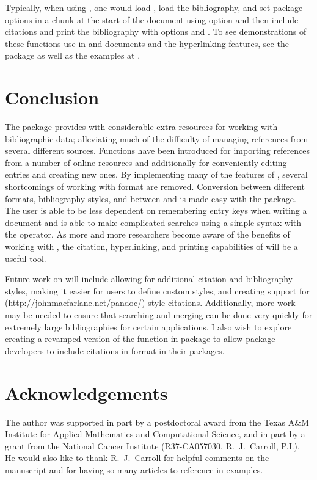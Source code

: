 \documentclass[article]{jss}\usepackage[]{graphicx}\usepackage[]{color}
\newcommand{\ourpkg}{\pkg{RefManageR}}
\newcommand{\bt}{\`{}}
\begin{document}
Typically, when using , one would load \ourpkg{}, load the bibliography, and set package options in a chunk at the start of the document using option  and then include citations and print the bibliography with options  and .  To see demonstrations of these functions use in  and  documents and the hyperlinking features, see the package  as well as the examples at .

\section{Conclusion}\label{sec_conc}
The \ourpkg{} package provides \R{} with considerable extra resources for working with bibliographic data; alleviating much of the difficulty of managing references from several different sources.  Functions have been introduced for importing references from a number of online resources and additionally for conveniently editing entries and creating new ones.  By implementing many of the features of \Biblatex{}, several shortcomings of working with \Bibtex{} format are removed. Conversion between different formats, bibliography styles, and between \Biblatex{} and \Bibtex{} is made easy with the package.  The user is able to be less dependent on remembering entry keys when writing a document and is able to make complicated searches using a simple syntax with the \code{\bt[\bt} operator.  As more and more researchers become aware of the benefits of working with , the citation, hyperlinking, and printing capabilities of \ourpkg{} will be a useful tool.

Future work on \ourpkg{} will include allowing for additional citation and bibliography styles,  making it easier for users to define custom styles, and creating support for  (\url{http://johnmacfarlane.net/pandoc/}) style citations.  Additionally, more work may be needed to ensure that searching and merging can be done very quickly for extremely large bibliographies for certain applications.  I also wish to explore creating a revamped version of the  function in package  to allow package developers to include citations in \Biblatex{} format in their packages.
\section*{Acknowledgements}
The author was supported in part by a postdoctoral award from the Texas A\&M Institute for Applied Mathematics and Computational Science, and in part by a grant from the National Cancer Institute (R37-CA057030, R.\ J.\ Carroll, P.I.).  He would also like to thank R.\ J.\ Carroll for helpful comments on the manuscript and for having so many articles to reference in examples.

\end{document}
